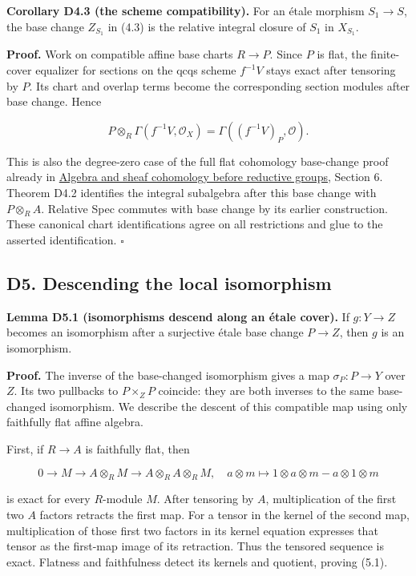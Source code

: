 \documentclass[11pt,a4paper,openany]{report}
\begin{document}
\textbf{Corollary D4.3 (the scheme compatibility).} For an étale morphism \(S_1\to S\), the base change \(Z_{S_1}\) in (4.3) is the relative integral closure of \(S_1\) in \(X_{S_1}\).

\textbf{Proof.} Work on compatible affine base charts \(R\to P\). Since \(P\) is flat, the finite-cover equalizer for sections on the qcqs scheme \(f^{-1}V\) stays exact after tensoring by \(P\). Its chart and overlap terms become the corresponding section modules after base change. Hence

\[
P\otimes_R\Gamma(f^{-1}V,\mathcal O_X)
=\Gamma((f^{-1}V)_P,\mathcal O).
\]

This is also the degree-zero case of the full flat cohomology base-change proof already in \href{https://github.com/KokunoYumeto/open-math-courses/blob/main/docs/courses/AG-RG/AG-RG-S01.md}{Algebra and sheaf cohomology before reductive groups}, Section 6. Theorem D4.2 identifies the integral subalgebra after this base change with \(P\otimes_RA\). Relative Spec commutes with base change by its earlier construction. These canonical chart identifications agree on all restrictions and glue to the asserted identification. \(\square\)

\subsection{D5. Descending the local isomorphism}\label{AG-RG-S04-d5.-descending-the-local-isomorphism}

\textbf{Lemma D5.1 (isomorphisms descend along an étale cover).} If \(g:Y\to Z\) becomes an isomorphism after a surjective étale base change \(P\to Z\), then \(g\) is an isomorphism.

\textbf{Proof.} The inverse of the base-changed isomorphism gives a map \(\sigma_P:P\to Y\) over \(Z\). Its two pullbacks to \(P\times_ZP\) coincide: they are both inverses to the same base-changed isomorphism. We describe the descent of this compatible map using only faithfully flat affine algebra.

First, if \(R\to A\) is faithfully flat, then

\[
0\longrightarrow M\longrightarrow A\otimes_RM
\longrightarrow A\otimes_RA\otimes_RM,\quad
a\otimes m\longmapsto1\otimes a\otimes m-a\otimes1\otimes m             \tag{5.1}
\]

is exact for every \(R\)-module \(M\). After tensoring by \(A\), multiplication of the first two \(A\) factors retracts the first map. For a tensor in the kernel of the second map, multiplication of those first two factors in its kernel equation expresses that tensor as the first-map image of its retraction. Thus the tensored sequence is exact. Flatness and faithfulness detect its kernels and quotient, proving (5.1).
\end{document}
